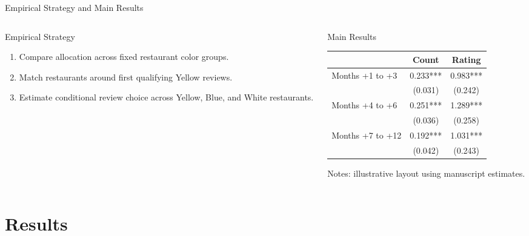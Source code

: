 \documentclass[aspectratio=169,11pt]{beamer}
\begin{document}
\begin{frame}{Empirical Strategy and Main Results}
\begin{columns}[T,totalwidth=\textwidth]
  \begin{column}{0.48\textwidth}
    \begin{PMpanel}{Empirical Strategy}
      \begin{enumerate}
        \item Compare allocation across fixed restaurant color groups.
        \item Match restaurants around first qualifying Yellow reviews.
        \item Estimate conditional review choice across Yellow, Blue, and White restaurants.
      \end{enumerate}
    \end{PMpanel}
  \end{column}
  \begin{column}{0.48\textwidth}
    \begin{PMpanel}{Main Results}
      \centering\scriptsize
      \begin{tabular}{lcc}
        \toprule
        & Count & Rating \\
        \midrule
        Months +1 to +3  & 0.233*** & 0.983*** \\
                         & (0.031)  & (0.242)  \\
        Months +4 to +6  & 0.251*** & 1.289*** \\
                         & (0.036)  & (0.258)  \\
        Months +7 to +12 & 0.192*** & 1.031*** \\
                         & (0.042)  & (0.243)  \\
        \bottomrule
      \end{tabular}
      \vspace{.20cm}

      \raggedright\tiny Notes: illustrative layout using manuscript estimates.
    \end{PMpanel}
  \end{column}
\end{columns}
\end{frame}

\section{Results}
\end{document}

